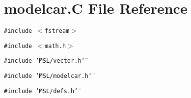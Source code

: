 \section{modelcar.C File Reference}
\label{modelcar_8C}
{\tt \#include $<$fstream$>$}\par
{\tt \#include $<$math.h$>$}\par
{\tt \#include \char`\"{}MSL/vector.h\char`\"{}}\par
{\tt \#include \char`\"{}MSL/modelcar.h\char`\"{}}\par
{\tt \#include \char`\"{}MSL/defs.h\char`\"{}}\par
